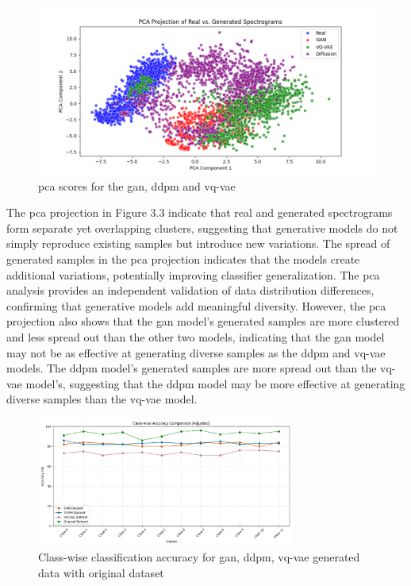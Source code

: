 \begin{figure}[h]
\includegraphics[width=\textwidth]{figures/PCA (1).png}
\centering
\caption{ \gls{pca} scores for the \gls{gan}, \gls{ddpm} and \gls{vq-vae}}
\centering
\end{figure}
The \gls{pca} projection in Figure 3.3 indicate that real and generated spectrograms form separate yet overlapping clusters, suggesting that generative models 
do not simply reproduce existing samples but introduce new variations. The spread of generated samples in the \gls{pca} projection indicates that the models 
create additional variations, potentially improving classifier generalization. The \gls{pca} analysis provides an independent validation of data distribution 
differences, confirming that generative models add meaningful diversity.
However, the \gls{pca} projection also shows that the \gls{gan} model's generated samples are more clustered and less spread out than the other two models, 
indicating that the \gls{gan} model may not be as effective at generating diverse samples as the \gls{ddpm} and \gls{vq-vae} models. The \gls{ddpm} model's 
generated samples are more spread out than the \gls{vq-vae} model's, suggesting that the \gls{ddpm} model may be more effective at generating diverse samples 
than the \gls{vq-vae} model.


\begin{figure}[t]
    \includegraphics[width=8.5cm]{figures/final_graph.png}
    \centering
    \caption{Class-wise classification accuracy for \gls{gan}, \gls{ddpm}, \gls{vq-vae} generated data with original dataset}
    \centering
    \end{figure}
    
